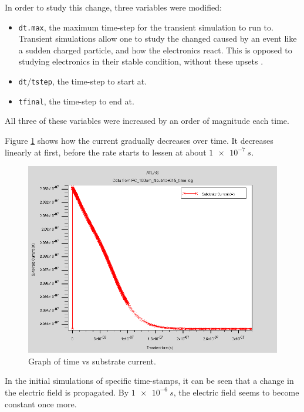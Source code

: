 \documentclass[12pt]{article}
\begin{document}
In order to study this change, three variables were modified:
\begin{itemize}
  \item \lstinline{dt.max}, the maximum time-step for the transient simulation to run to. Transient simulations allow one to study the changed caused by an event like a sudden charged particle, and how the electronics react. This is opposed to studying electronics in their stable condition, without these upsets \citep{deshpande}.
  \item \lstinline{dt}/\lstinline{tstep}, the time-step to start at.
  \item \lstinline{tfinal}, the time-step to end at.
\end{itemize}
All three of these variables were increased by an order of magnitude each time.

Figure \ref{fig:timevcurrent} shows how the current gradually decreases over time. It decreases linearly at first, before the rate starts to lessen at about $\SI{1e-7}{s}$.

\begin{figure}[H]
  \centering
  \includegraphics[width=\textwidth]{timevcurrent}
  \caption{Graph of time vs substrate current.}
  \label{fig:timevcurrent}
\end{figure}

In the initial simulations of specific time-stamps, it can be seen that a change in the electric field is propagated. By $\SI{1e-6}{s}$, the electric field seems to become constant once more.
\end{document}
